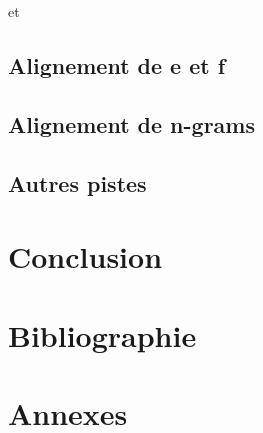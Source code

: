 \documentclass[a4paper,10pt]{article}
\begin{document}
et %



\subsection{Alignement de e et f}

\subsection{Alignement de n-grams}

\subsection{Autres pistes}


\section{Conclusion}


\section{Bibliographie}




\section{Annexes}

\end{document}
